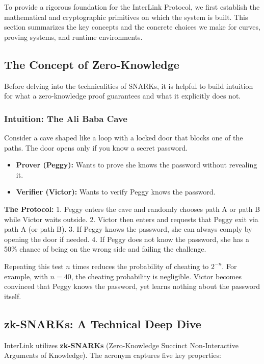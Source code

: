 \documentclass[11pt,a4paper]{article}
\begin{document}
To provide a rigorous foundation for the InterLink Protocol, we first establish the mathematical and cryptographic primitives on which the system is built. This section summarizes the key concepts and the concrete choices we make for curves, proving systems, and runtime environments.

\subsection{The Concept of Zero-Knowledge}
Before delving into the technicalities of SNARKs, it is helpful to build intuition for what a zero-knowledge proof guarantees and what it explicitly does not.

\subsubsection{Intuition: The Ali Baba Cave}
Consider a cave shaped like a loop with a locked door that blocks one of the paths. The door opens only if you know a secret password.
\begin{itemize}
    \item \textbf{Prover (Peggy):} Wants to prove she knows the password without revealing it.
    \item \textbf{Verifier (Victor):} Wants to verify Peggy knows the password.
\end{itemize}
\textbf{The Protocol:}
1. Peggy enters the cave and randomly chooses path A or path B while Victor waits outside.
2. Victor then enters and requests that Peggy exit via path A (or path B).
3. If Peggy knows the password, she can always comply by opening the door if needed.
4. If Peggy does not know the password, she has a 50\% chance of being on the wrong side and failing the challenge.

Repeating this test $n$ times reduces the probability of cheating to $2^{-n}$. For example, with $n=40$, the cheating probability is negligible. Victor becomes convinced that Peggy knows the password, yet learns nothing about the password itself.

\subsection{zk-SNARKs: A Technical Deep Dive}
InterLink utilizes \textbf{zk-SNARKs} (Zero-Knowledge Succinct Non-Interactive Arguments of Knowledge). The acronym captures five key properties:
\end{document}
